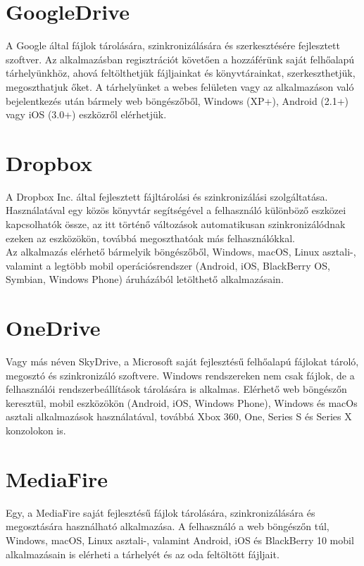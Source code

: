 \documentclass[12pt]{report}
\begin{document}
\section{GoogleDrive}
A Google által fájlok tárolására, szinkronizálására és szerkesztésére fejlesztett szoftver. Az alkalmazásban regisztrációt követően a hozzáférünk saját felhőalapú tárhelyünkhöz, ahová feltölthetjük fájljainkat és könyvtárainkat, szerkeszthetjük, megoszthatjuk őket.
A tárhelyünket a webes felületen vagy az alkalmazáson való bejelentkezés után bármely web böngészőből, Windows (XP+), Android (2.1+) vagy iOS (3.0+) eszközről elérhetjük.

\section{Dropbox}
A Dropbox Inc. által fejlesztett fájltárolási és szinkronizálási szolgáltatása. Használatával egy közös könyvtár segítségével a felhasználó különböző eszközei kapcsolhatók össze, az itt történő változások automatikusan szinkronizálódnak ezeken az eszközökön, továbbá megoszthatóak más felhasználókkal.\\
Az alkalmazás elérhető bármelyik böngészőből, Windows, macOS, Linux asztali-, valamint a legtöbb mobil operációsrendszer (Android, iOS, BlackBerry OS, Symbian, Windows Phone) áruházából letölthető alkalmazásain.

\section{OneDrive}
Vagy más néven SkyDrive, a Microsoft saját fejlesztésű felhőalapú fájlokat tároló, megosztó és szinkronizáló szoftvere. Windows rendszereken nem csak fájlok, de a felhasználói rendszerbeállítások tárolására is alkalmas. Elérhető web böngészőn keresztül, mobil eszközökön (Android, iOS, Windows Phone), Windows és macOs asztali alkalmazások használatával, továbbá Xbox 360, One, Series S és Series X konzolokon is.

\section{MediaFire}
Egy, a MediaFire saját fejlesztésű fájlok tárolására, szinkronizálására és megosztására használható alkalmazása. A felhasználó a web böngészőn túl, Windows, macOS, Linux asztali-, valamint Android, iOS és BlackBerry 10 mobil alkalmazásain is elérheti a tárhelyét és az oda feltöltött fájljait.
\end{document}
